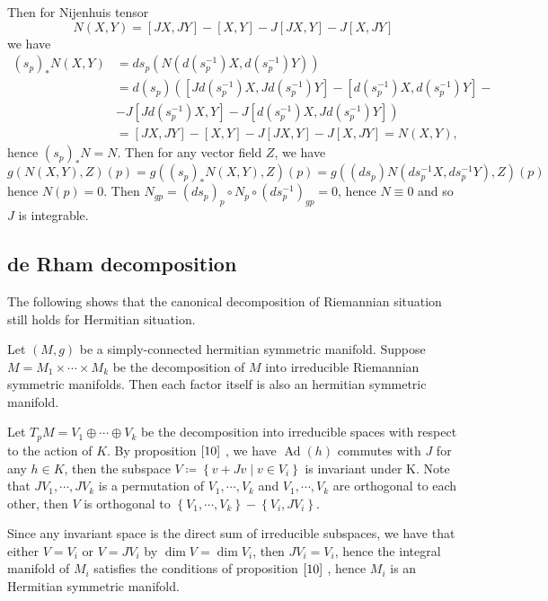 Then for Nijenhuis tensor
\[
N(X, Y)=[J X, J Y]-[X, Y]-J[J X, Y]-J[X, J Y]
\]
we have
\[
\begin{aligned}
	\left(s_{p}\right)_{*} N(X, Y) &=d
	s_{p}\left(N\left(d\left(s_{p}^{-1}\right) X,
	d\left(s_{p}^{-1}\right) Y\right)\right) \\
	&=d\left(s_{p}\right)\left(\left[J d\left(s_{p}^{-1}\right)
	X, J d\left(s_{p}^{-1}\right)
	Y\right]-\left[d\left(s_{p}^{-1}\right) X,
	d\left(s_{p}^{-1}\right) Y\right]-\right.\\
	&\left.-J\left[J d\left(s_{p}^{-1}\right) X,
	Y\right]-J\left[d\left(s_{p}^{-1}\right) X, J
	d\left(s_{p}^{-1}\right) Y\right]\right) \\
	&=[J X, J Y]-[X, Y]-J[J X, Y]-J[X, J Y]=N(X, Y),
\end{aligned}
\]
hence $\left(s_{p}\right)_{*} N=N$. Then for any vector field
$Z$, we have
\[
g(N(X, Y), Z)(p)=g\left(\left(s_{p}\right)_{*} N(X, Y),
Z\right)(p)=g\left(\left(d s_{p}\right) N\left(d s_{p}^{-1} X, d
s_{p}^{-1} Y\right), Z\right)(p)
\]
hence $N(p)=0$. Then $N_{g p}=\left(d s_{p}\right)_{p} \circ
N_{p} \circ\left(d s_{p}^{-1}\right)_{g p}=0$, hence $N \equiv 0$
and so $J$ is integrable.
\eproof
\subsection{de Rham decomposition}

The following shows that the canonical decomposition of
Riemannian situation still holds for Hermitian situation.

\begin{theorem}
Let $(M, g)$ be a simply-connected hermitian symmetric manifold.
Suppose $M=M_{1} \times \cdots \times M_{k}$ be the decomposition
of $M$ into irreducible Riemannian symmetric manifolds. Then each
factor itself is also an hermitian symmetric manifold.	
\end{theorem}
\bproof
Let $T_{p} M=V_{1} \oplus \cdots \oplus V_{k}$ be the
decomposition into irreducible spaces with respect to the action
of $K$. By proposition $\ref{10}$ , we have
$\operatorname{Ad}(h)$ commutes with $J$ for any $h \in K$, then
the subspace $V\coloneq \left\{v+J v \mid v \in V_{i}\right\}$ is
invariant under
K. Note that $J V_{1}, \cdots, J V_{k}$ is a permutation of
$V_{1}, \cdots, V_{k}$ and $V_{1}, \cdots, V_{k}$ are orthogonal
to each other, then $V$ is orthogonal to $\left\{V_{1}, \cdots,
V_{k}\right\}-\left\{V_{i}, J V_{i}\right\}$.

Since any invariant space is the direct sum of irreducible
subspaces, we have that either $V=V_{i}$ or $V=J V_{i}$ by
$\operatorname{dim} V=\operatorname{dim} V_{i}$, then $J
V_{i}=V_{i}$, hence the integral manifold of $M_{i}$ satisfies
the conditions of proposition $\ref{10}$ , hence $M_{i}$ is
an Hermitian symmetric manifold.
\eproof

